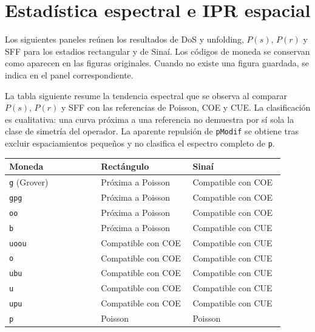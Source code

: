 \section{Estadística espectral e IPR espacial} %
Los siguientes paneles reúnen los resultados de DoS y unfolding, $P(s)$,
$P(r)$ y SFF para los estadios rectangular y de Sinaí. Los códigos de moneda
se conservan como aparecen en las figuras originales. Cuando no existe una
figura guardada, se indica en el panel correspondiente.

La tabla siguiente resume la tendencia espectral que
se observa al comparar $P(s)$, $P(r)$ y SFF con las referencias de Poisson,
COE y CUE. La clasificación es cualitativa: una curva próxima a una
referencia no demuestra por sí sola la clase de simetría del operador.
La aparente repulsión de \texttt{pModif} se obtiene tras excluir
espaciamientos pequeños y no clasifica el espectro completo de \texttt{p}.
\begin{table}[H]
  \centering
  \renewcommand{\arraystretch}{1.18}
  \begin{tabular}{@{}p{0.30\linewidth}p{0.30\linewidth}p{0.30\linewidth}@{}}
    \hline\hline
    Moneda & Rectángulo & Sinaí \\
    \hline
    \texttt{g} (Grover) & Próxima a Poisson & Compatible con COE \\
    \texttt{gpg} & Próxima a Poisson & Compatible con COE \\
    \texttt{oo} & Próxima a Poisson & Compatible con COE \\
    \texttt{b} & Próxima a Poisson & Compatible con CUE \\
    \texttt{uoou} & Compatible con COE & Compatible con CUE \\
    \texttt{o} & Compatible con COE & Compatible con CUE \\
    \texttt{ubu} & Compatible con COE & Compatible con CUE \\
    \texttt{u} & Compatible con COE & Compatible con CUE \\
    \texttt{upu} & Compatible con COE & Compatible con CUE \\
    \texttt{p} & Poisson
      & Poisson \\
    \hline\hline
  \end{tabular}
\end{table}


